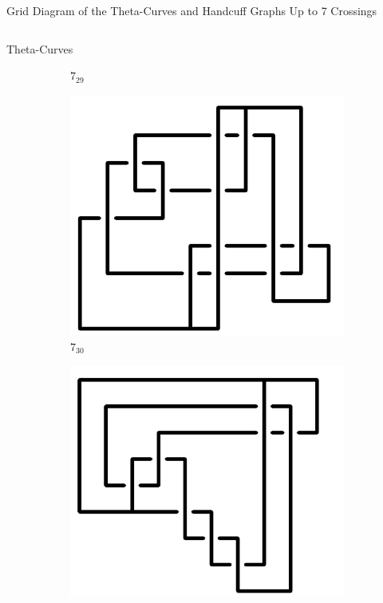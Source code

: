 \documentclass[final]{beamer}
\begin{document}
\begin{frame}[t]
\begin{alertblock}{Grid Diagram of the Theta-Curves and Handcuff Graphs Up to 7 Crossings}
\begin{columns}[t]
\begin{column}{0.5\textwidth}
\begin{alertblock}{Theta-Curves}
\begin{figure}
\begin{subfigure}{0.075\textwidth}
    \caption{$7_{29}$} 
    \end{subfigure}
    \begin{subfigure}{0.075\textwidth}
    \includegraphics[width=\columnwidth]{../Midterm_Poster/grid_diagram/theta_7_30.png}
    \caption{$7_{30}$}
    \end{subfigure}
    \begin{subfigure}{0.075\textwidth}
    \includegraphics[width=\columnwidth]{../Midterm_Poster/grid_diagram/theta_7_31.png}

\end{subfigure}
\end{figure}
\end{alertblock}
\end{column}
\end{columns}
\end{alertblock}
\end{frame}
\end{document}
